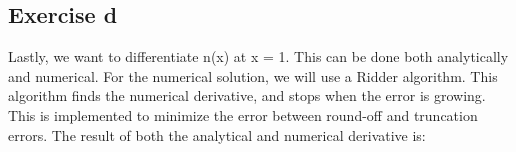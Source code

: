 \subsection{Exercise d}

Lastly, we want to differentiate n(x) at x = 1. This can be done both analytically and numerical. For the numerical solution, we will use a Ridder algorithm. This algorithm finds the numerical derivative, and stops when the error is growing. This is implemented to minimize the error between round-off and truncation errors. The result of both the analytical and numerical derivative is: 




